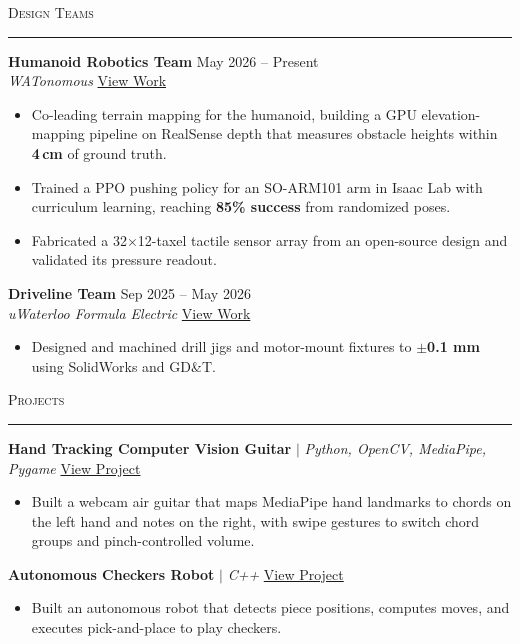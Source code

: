 \documentclass[letterpaper,10pt]{article}
\newcommand{\header}[1]{%
    \vspace{4pt}%
    {\textsc{#1}}\par\vspace{-7pt}%
    \rule{\linewidth}{0.4pt}\par\vspace{1pt}%
}
\newcommand{\role}[4]{%
    \vspace{2pt}%
    \textbf{#1} \hfill #2\\
    \textit{#3} \hfill #4\par
}
\newcommand{\project}[3]{%
    \vspace{2pt}%
    \textbf{#1} $|$ \textit{#2} \hfill #3\par
}
\begin{document}
\header{Design Teams}

\role{Humanoid Robotics Team}{May 2026 -- Present}
     {WATonomous}{\href{https://johnsonyep.com/\#watonomous}{View Work}}
\begin{itemize}
    \item Co-leading terrain mapping for the humanoid, building a GPU elevation-mapping pipeline on RealSense depth that measures obstacle heights within \textbf{4\,cm} of ground truth.
    \item Trained a PPO pushing policy for an SO-ARM101 arm in Isaac Lab with curriculum learning, reaching \textbf{85\% success} from randomized poses.
    \item Fabricated a 32$\times$12-taxel tactile sensor array from an open-source design and validated its pressure readout.
\end{itemize}

\role{Driveline Team}{Sep 2025 -- May 2026}
     {uWaterloo Formula Electric}{\href{https://johnsonyep.com/\#uwfe}{View Work}}
\begin{itemize}
    \item Designed and machined drill jigs and motor-mount fixtures to \textbf{$\pm$0.1 mm} using SolidWorks and GD\&T.
\end{itemize}

\header{Projects}

\project{Hand Tracking Computer Vision Guitar}{Python, OpenCV, MediaPipe, Pygame}{\href{https://johnsonyep.com/\#guitar-cv}{View Project}}
\begin{itemize}
    \item Built a webcam air guitar that maps MediaPipe hand landmarks to chords on the left hand and notes on the right, with swipe gestures to switch chord groups and pinch-controlled volume.
\end{itemize}

\project{Autonomous Checkers Robot}{C++}{\href{https://johnsonyep.com/\#checkers}{View Project}}
\begin{itemize}
    \item Built an autonomous robot that detects piece positions, computes moves, and executes pick-and-place to play checkers.
\end{itemize}
\end{document}
